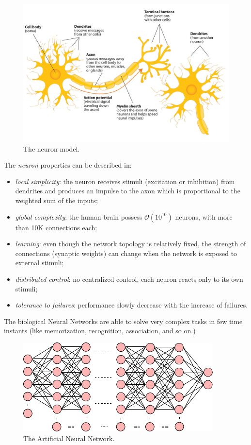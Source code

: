 
\begin{figure}[t]
	\centering
	\includegraphics[width=0.4\linewidth]{img/neuron_model}
	\caption{The neuron model.}
\end{figure}

The \textit{neuron} properties can be described in:
\begin{itemize}
	\item \textit{local simplicity}: the neuron receives stimuli (excitation or inhibition) from dendrites and produces an impulse to the axon which is proportional to the weighted sum of the inputs;
	\item \textit{global complexity}: the human brain possess 
	$\mathcal{O}(10^{10})$ 
	neurons, with more than 10K connections each;
	\item \textit{learning}: even though the network topology is relatively fixed, the strength of connections (synaptic weights) can change when the network is exposed to external stimuli;
	\item \textit{distributed control}: no centralized control, each neuron reacts only to its own stimuli;
	\item \textit{tolerance to failures}: performance slowly decrease with the increase of failures.
\end{itemize}

The biological Neural Networks are able to solve very complex tasks in few time instants (like memorization, recognition, association, and so on.)

\begin{figure}[t]
	\centering
	\includegraphics[width=\textwidth]{img/ANN}
	\caption{The Artificial Neural Network.}
\end{figure}

